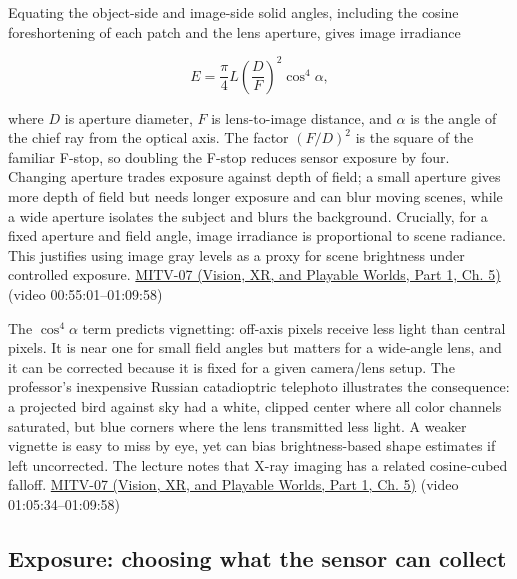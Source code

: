 Equating the object-side and image-side solid angles, including the cosine foreshortening of each patch and the lens aperture, gives image irradiance

\[
E=\frac{\pi}{4}L\left(\frac{D}{F}\right)^2\cos^4\alpha,
\]

where \(D\) is aperture diameter, \(F\) is lens-to-image distance, and \(\alpha\) is the angle of the chief ray from the optical axis. The factor \((F/D)^2\) is the square of the familiar F-stop, so doubling the F-stop reduces sensor exposure by four. Changing aperture trades exposure against depth of field; a small aperture gives more depth of field but needs longer exposure and can blur moving scenes, while a wide aperture isolates the subject and blurs the background. Crucially, for a fixed aperture and field angle, image irradiance is proportional to scene radiance. This justifies using image gray levels as a proxy for scene brightness under controlled exposure. \href{../07-Vision-XR-and-Playable-Worlds-P01/main.pdf\#nameddest=04-visual-computing-ii-ch036-mitv-07---gradient-space-reflectance-map-image-irradiance-equation-gnomonic-projection}{MITV-07 (Vision, XR, and Playable Worlds, Part 1, Ch. 5)} (video 00:55:01--01:09:58)

The \(\cos^4\alpha\) term predicts vignetting: off-axis pixels receive less light than central pixels. It is near one for small field angles but matters for a wide-angle lens, and it can be corrected because it is fixed for a given camera/lens setup. The professor's inexpensive Russian catadioptric telephoto illustrates the consequence: a projected bird against sky had a white, clipped center where all color channels saturated, but blue corners where the lens transmitted less light. A weaker vignette is easy to miss by eye, yet can bias brightness-based shape estimates if left uncorrected. The lecture notes that X-ray imaging has a related cosine-cubed falloff. \href{../07-Vision-XR-and-Playable-Worlds-P01/main.pdf\#nameddest=04-visual-computing-ii-ch036-mitv-07---gradient-space-reflectance-map-image-irradiance-equation-gnomonic-projection}{MITV-07 (Vision, XR, and Playable Worlds, Part 1, Ch. 5)} (video 01:05:34--01:09:58)

\subsection{Exposure: choosing what the sensor can collect}\label{03-visual-computing-i-ch003-exposure-choosing-what-the-sensor-can-collect}

\hypertarget{03-visual-computing-i-ch003-exposure-choosing-what-the-sensor-can-collect}{}

